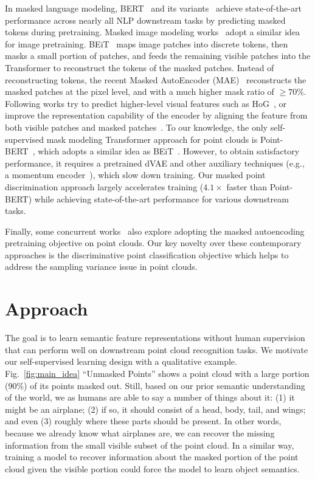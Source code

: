 \documentclass[runningheads]{llncs}
\begin{document}
In masked language modeling, BERT~\cite{devlin-etal-2019-bert} and its variants~\cite{joshi2020spanbert,Lan2020ALBERT} achieve state-of-the-art performance across nearly all NLP downstream tasks by predicting masked tokens during pretraining.  Masked image modeling works~\cite{bao2021beit,mae} adopt a similar idea 
for image pretraining. BEiT~\cite{bao2021beit} maps image patches into discrete tokens, then masks a small portion of patches, and feeds the remaining visible patches into the Transformer to reconstruct the tokens of the masked patches. Instead of reconstructing tokens, the recent Masked AutoEncoder (MAE)~\cite{mae} reconstructs the masked patches at the pixel level, and with a much higher mask ratio of $\geq 70\%$. Following works try to predict higher-level visual features such as HoG~\cite{wei2021masked}, or improve the representation capability of the encoder by aligning the feature from both visible patches and masked patches~\cite{chen2022context}. To our knowledge, the only self-supervised mask modeling Transformer approach for point clouds is Point-BERT~\cite{yu2021point}, which adopts a similar idea as BEiT~\cite{bao2021beit}. However, to obtain satisfactory performance, it requires a pretrained dVAE and other auxiliary techniques (e.g., a momentum encoder~\cite{he2020momentum}), which slow down training.  Our masked point discrimination approach largely accelerates training (\textbf{$4.1\times$} faster than Point-BERT) while achieving state-of-the-art performance for various downstream tasks.

Finally, some concurrent works~\cite{pang2022masked} also explore adopting the masked autoencoding pretraining objective on point clouds. Our key novelty over these contemporary approaches is the discriminative point classification objective which helps to address the sampling variance issue in point clouds.
 \section{Approach}

The goal is to learn semantic feature representations without human supervision that can perform well on downstream point cloud recognition tasks.
We motivate our self-supervised learning design with a qualitative example.  Fig.~\ref{fig:main_idea} ``Unmasked Points'' shows a point cloud with a large portion (90\%) of its points masked out.  Still, based on our prior semantic understanding of the world, we as humans are able to say a number of things about it: (1) it might be an airplane; (2) if so, it should consist of a head, body, tail, and wings; and even (3) roughly where these parts should be present.  In other words, because we already know what airplanes are, we can recover the missing information from the small visible subset of the point cloud.  In a similar way, training a model to recover information about the masked portion of the point cloud given the visible portion could force the model to learn object semantics.
\end{document}
